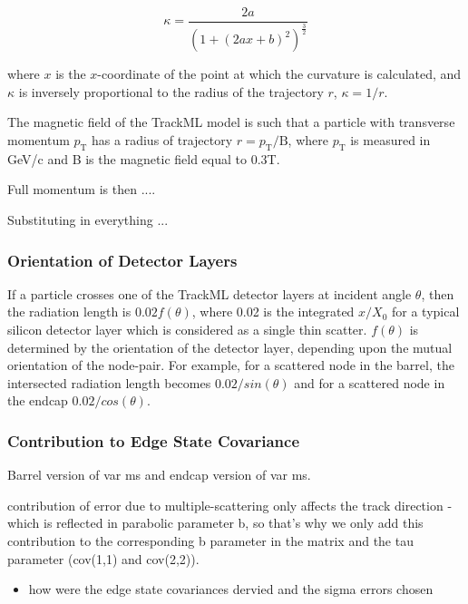 \begin{equation}
\kappa = \frac{2a}{(1 + (2ax + b)^2)^{\frac{3}{2}}}
\label{eqn:kappa}
\end{equation}

where $x$ is the $x$-coordinate of the point at which the curvature is calculated, and $\kappa$ is inversely proportional to the radius of the trajectory $r$, $\kappa = 1/r$.

The magnetic field of the TrackML model is such that a particle with transverse momentum $p_\text{T}$ has a radius of trajectory $r = p_\text{T} / \text{B} $, where $p_\text{T}$ is measured in GeV/c and B is the magnetic field equal to 0.3T. 

Full momentum is then ....

Substituting in everything ...


\subsubsection{Orientation of Detector Layers}

If a particle crosses one of the TrackML detector layers at incident angle $\theta$, then the radiation length is $0.02 f(\theta)$, where 0.02 is the integrated $x/X_0$ for a typical silicon detector layer which is considered as a single thin scatter. $f(\theta)$ is determined by the orientation of the detector layer, depending upon the mutual orientation of the node-pair. For example, for a scattered node in the barrel, the intersected radiation length becomes $0.02 / sin(\theta)$ and for a scattered node in the endcap $0.02 / cos(\theta)$.


\subsubsection{Contribution to Edge State Covariance}

Barrel version of var ms and endcap version of var ms.

contribution of error due to multiple-scattering only affects the track direction - which is reflected in parabolic parameter b, so that's why we only add this contribution to the corresponding b parameter in the matrix and the tau parameter (cov(1,1) and cov(2,2)).


\begin{itemize}
\item how were the edge state covariances dervied and the sigma errors chosen

\end{itemize}





